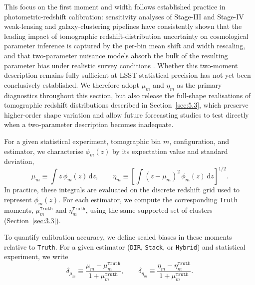 This focus on the first moment and width follows established practice in photometric-redshift calibration: sensitivity analyses of Stage-III and Stage-IV weak-lensing and galaxy-clustering pipelines have consistently shown that the leading impact of tomographic redshift-distribution uncertainty on cosmological parameter inference is captured by the per-bin mean shift and width rescaling, and that two-parameter nuisance models absorb the bulk of the resulting parameter bias under realistic survey conditions \citep{2006ApJ...636...21M, 2024MNRAS.530.4412R, 2026arXiv260400805E}. Whether this two-moment description remains fully sufficient at LSST statistical precision has not yet been conclusively established. We therefore adopt \(\mu_m\) and \(\eta_m\) as the primary diagnostics throughout this section, but also release the full-shape realisations of tomographic redshift distributions described in Section~\ref{sec:5.3}, which preserve higher-order shape variation and allow future forecasting studies to test directly when a two-parameter description becomes inadequate.

For a given statistical experiment, tomographic bin \(m\), configuration, and estimator, we characterise \(\phi_m(z)\) by its expectation value and standard deviation,
\begin{equation} \label{eq:21}
    \mu_m \equiv \int z \, \phi_m(z)\, \mathrm{d}z, \qquad \eta_m \equiv \left[\int \left(z-\mu_m\right)^2 \, \phi_m(z)\, \mathrm{d}z \right]^{1/2}.
\end{equation}
In practice, these integrals are evaluated on the discrete redshift grid used to represent \(\phi_m(z)\). For each estimator, we compute the corresponding \texttt{Truth} moments, \(\mu_m^{\texttt{Truth}}\) and \(\eta_m^{\texttt{Truth}}\), using the same supported set of clusters (Section~\ref{sec:3.3}).

To quantify calibration accuracy, we define scaled biases in these moments relative to \texttt{Truth}. For a given estimator (\texttt{DIR}, \texttt{Stack}, or \texttt{Hybrid}) and statistical experiment, we write
\begin{equation} \label{eq:22}
    \delta_{\mu_m} \equiv \frac{\mu_m -\mu_m^{\texttt{Truth}}}{1 + \mu_m^{\texttt{Truth}}}, \qquad \delta_{\eta_m} \equiv \frac{\eta_m -\eta_m^{\texttt{Truth}}}{1 + \mu_m^{\texttt{Truth}}}.
\end{equation}

